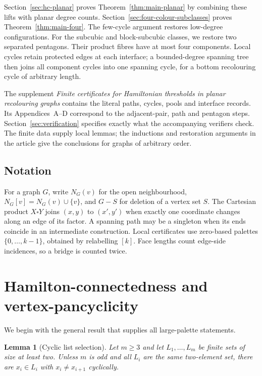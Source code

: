 \documentclass[11pt]{article}
\newtheorem{lemma}[theorem]{Lemma}
\theoremstyle{remark}
\numberwithin{equation}{section}
\numberwithin{table}{section}
\begin{document}
Section~\ref{sec:hc-planar} proves Theorem~\ref{thm:main-planar} by
combining these lifts with planar degree counts. Section~\ref{sec:four-colour-subclasses}
proves Theorem~\ref{thm:main-four}. The few-cycle argument restores
low-degree configurations. For the subcubic and block-subcubic classes,
we restore two separated pentagons. Their product fibres have at most
four components. Local cycles retain protected edges at each interface;
a bounded-degree spanning tree then joins all component cycles into
one spanning cycle, for a bottom recolouring cycle of arbitrary length.

The supplement \emph{Finite certificates for Hamiltonian thresholds in
planar recolouring graphs} contains the literal paths, cycles, pools
and interface records. Its Appendices~A--D correspond to the adjacent-pair,
path and pentagon steps. Section~\ref{sec:verification} specifies exactly
what the accompanying verifiers check. The finite data supply local
lemmas; the inductions and restoration arguments in the article give
the conclusions for graphs of arbitrary order.

\subsection{Notation}
For a graph $G$, write $N_G(v)$ for the open neighbourhood,
$N_G[v]=N_G(v)\cup\{v\}$, and $G-S$ for deletion of a vertex set $S$.
The Cartesian product $X\square Y$ joins $(x,y)$ to $(x',y')$ when
exactly one coordinate changes along an edge of its factor.
A spanning path may be a singleton when its ends coincide in an
intermediate construction. Local certificates use zero-based palettes
$\{0,\ldots,k-1\}$, obtained by relabelling $[k]$.
Face lengths count edge-side incidences, so a bridge is counted twice.

\section{Hamilton-connectedness and vertex-pancyclicity}
\label{sec:degenerate}

We begin with the general result that supplies all large-palette statements.

\begin{lemma}[Cyclic list selection]
\label{lem:list-cycle}
Let $m\ge3$ and let $L_1,\ldots,L_m$ be finite sets of size at least two.  Unless $m$ is odd and all $L_i$ are the same two-element set, there are $x_i\in L_i$ with $x_i\ne x_{i+1}$ cyclically.
\end{lemma}
\end{document}
